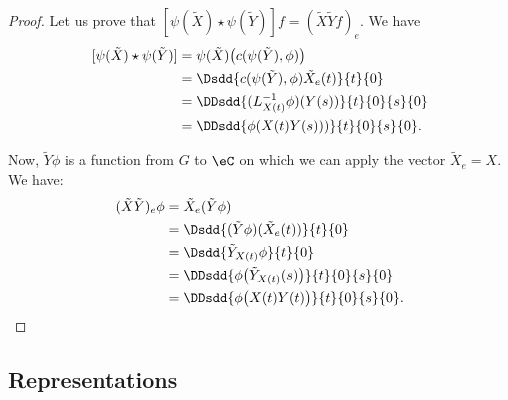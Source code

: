 \begin{proof}
Let us prove that $[\psi(\tilde X)\star\psi(\tilde Y)]f=(\tilde X\tilde Yf)_e$. We have
\begin{equation}
\begin{split}
   [\psi(\tilde X)\star\psi(\tilde Y)]&=\psi(\tilde X)\big( c(\psi(\tilde Y),\phi) \big)\\
		&=\Dsdd{ c(\psi(\tilde Y),\phi)\tilde X_e(t) }{t}{0}\\
		&=\DDsdd{ (L^{-1}_{X(t)}\phi)(Y(s)) }{t}{0}{s}{0}\\
		&=\DDsdd{ \phi(X(t)Y(s))) }{t}{0}{s}{0}.
\end{split}
\end{equation}

Now, $\tilde Y\phi$ is a function from $G$ to $\eC$ on which we can apply the vector $\tilde X_e=X$. We have:
\begin{equation}
\begin{split}
(\tilde X\tilde Y)_e\phi&=\tilde X_e(\tilde Y\phi)\\
		&=\Dsdd{ (\tilde Y\phi)(\tilde X_e(t)) }{t}{0}\\
		&=\Dsdd{ \tilde Y_{X(t)}\phi }{t}{0}\\
		&=\DDsdd{ \phi\big( \tilde Y_{X(t)}(s) \big) }{t}{0}{s}{0}\\
		&=\DDsdd{ \phi\big( X(t)Y(t) \big) }{t}{0}{s}{0}.
\end{split}
\end{equation}

\end{proof}

\subsection{Representations}

